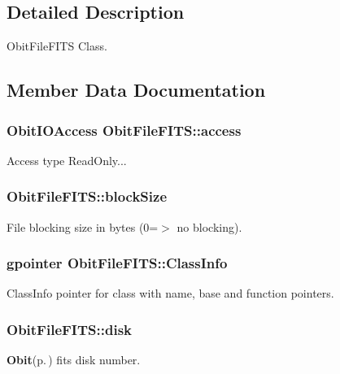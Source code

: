 \subsection{Detailed Description}
Obit\-File\-FITS Class. 



\subsection{Member Data Documentation}
\subsubsection{\setlength{\rightskip}{0pt plus 5cm}Obit\-IOAccess {\bf Obit\-File\-FITS::access}}\label{structObitFileFITS_o5}


Access type Read\-Only... 

\subsubsection{ {\bf Obit\-File\-FITS::block\-Size}}\label{structObitFileFITS_o9}


File blocking size in bytes (0=$>$ no blocking). 

\subsubsection{\setlength{\rightskip}{0pt plus 5cm}gpointer {\bf Obit\-File\-FITS::Class\-Info}}\label{structObitFileFITS_o1}


Class\-Info pointer for class with name, base and function pointers. 

\subsubsection{ {\bf Obit\-File\-FITS::disk}}\label{structObitFileFITS_o14}


{\bf Obit}{\rm (p.\,\pageref{structObit})} fits disk number. 

